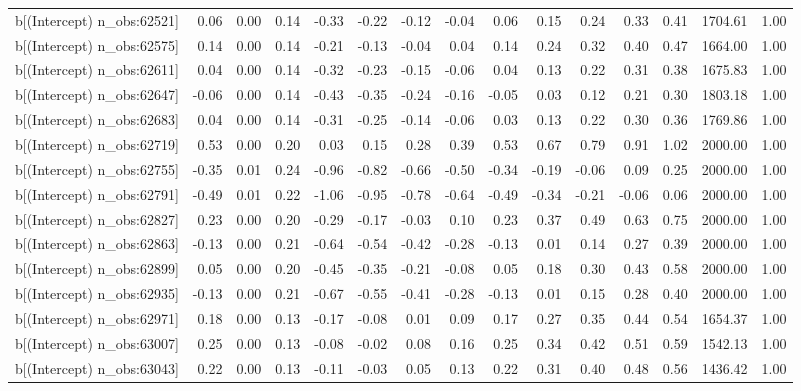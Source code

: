 \begin{table}[ht]
\begin{tabular}{rrrrrrrrrrrrrrr}
  b[(Intercept) n\_obs:62521] & 0.06 & 0.00 & 0.14 & -0.33 & -0.22 & -0.12 & -0.04 & 0.06 & 0.15 & 0.24 & 0.33 & 0.41 & 1704.61 & 1.00 \\ 
  b[(Intercept) n\_obs:62575] & 0.14 & 0.00 & 0.14 & -0.21 & -0.13 & -0.04 & 0.04 & 0.14 & 0.24 & 0.32 & 0.40 & 0.47 & 1664.00 & 1.00 \\ 
  b[(Intercept) n\_obs:62611] & 0.04 & 0.00 & 0.14 & -0.32 & -0.23 & -0.15 & -0.06 & 0.04 & 0.13 & 0.22 & 0.31 & 0.38 & 1675.83 & 1.00 \\ 
  b[(Intercept) n\_obs:62647] & -0.06 & 0.00 & 0.14 & -0.43 & -0.35 & -0.24 & -0.16 & -0.05 & 0.03 & 0.12 & 0.21 & 0.30 & 1803.18 & 1.00 \\ 
  b[(Intercept) n\_obs:62683] & 0.04 & 0.00 & 0.14 & -0.31 & -0.25 & -0.14 & -0.06 & 0.03 & 0.13 & 0.22 & 0.30 & 0.36 & 1769.86 & 1.00 \\ 
  b[(Intercept) n\_obs:62719] & 0.53 & 0.00 & 0.20 & 0.03 & 0.15 & 0.28 & 0.39 & 0.53 & 0.67 & 0.79 & 0.91 & 1.02 & 2000.00 & 1.00 \\ 
  b[(Intercept) n\_obs:62755] & -0.35 & 0.01 & 0.24 & -0.96 & -0.82 & -0.66 & -0.50 & -0.34 & -0.19 & -0.06 & 0.09 & 0.25 & 2000.00 & 1.00 \\ 
  b[(Intercept) n\_obs:62791] & -0.49 & 0.01 & 0.22 & -1.06 & -0.95 & -0.78 & -0.64 & -0.49 & -0.34 & -0.21 & -0.06 & 0.06 & 2000.00 & 1.00 \\ 
  b[(Intercept) n\_obs:62827] & 0.23 & 0.00 & 0.20 & -0.29 & -0.17 & -0.03 & 0.10 & 0.23 & 0.37 & 0.49 & 0.63 & 0.75 & 2000.00 & 1.00 \\ 
  b[(Intercept) n\_obs:62863] & -0.13 & 0.00 & 0.21 & -0.64 & -0.54 & -0.42 & -0.28 & -0.13 & 0.01 & 0.14 & 0.27 & 0.39 & 2000.00 & 1.00 \\ 
  b[(Intercept) n\_obs:62899] & 0.05 & 0.00 & 0.20 & -0.45 & -0.35 & -0.21 & -0.08 & 0.05 & 0.18 & 0.30 & 0.43 & 0.58 & 2000.00 & 1.00 \\ 
  b[(Intercept) n\_obs:62935] & -0.13 & 0.00 & 0.21 & -0.67 & -0.55 & -0.41 & -0.28 & -0.13 & 0.01 & 0.15 & 0.28 & 0.40 & 2000.00 & 1.00 \\ 
  b[(Intercept) n\_obs:62971] & 0.18 & 0.00 & 0.13 & -0.17 & -0.08 & 0.01 & 0.09 & 0.17 & 0.27 & 0.35 & 0.44 & 0.54 & 1654.37 & 1.00 \\ 
  b[(Intercept) n\_obs:63007] & 0.25 & 0.00 & 0.13 & -0.08 & -0.02 & 0.08 & 0.16 & 0.25 & 0.34 & 0.42 & 0.51 & 0.59 & 1542.13 & 1.00 \\ 
  b[(Intercept) n\_obs:63043] & 0.22 & 0.00 & 0.13 & -0.11 & -0.03 & 0.05 & 0.13 & 0.22 & 0.31 & 0.40 & 0.48 & 0.56 & 1436.42 & 1.00 \\ 

\end{tabular}
\end{table}
